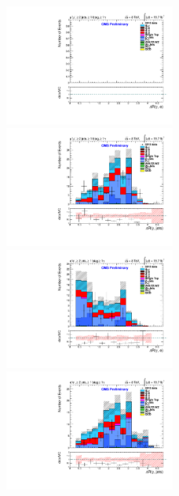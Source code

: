 \begin{figure}
\includegraphics[width=0.5\textwidth]{Plots/ControlPlots/TTbarPhotonAnalysis/MuMu/Photons/SignalPhotons/Photon_deltaR_electrons_splitTTbar_ratio.pdf}
\includegraphics[width=0.5\textwidth]{Plots/ControlPlots/TTbarPhotonAnalysis/MuMu/Photons/SignalPhotons/Photon_deltaR_jets_splitTTbar_ratio.pdf} \\
\includegraphics[width=0.5\textwidth]{Plots/ControlPlots/TTbarPhotonAnalysis/EE/Photons/SignalPhotons/Photon_deltaR_electrons_splitTTbar_ratio.pdf}
\includegraphics[width=0.5\textwidth]{Plots/ControlPlots/TTbarPhotonAnalysis/EE/Photons/SignalPhotons/Photon_deltaR_jets_splitTTbar_ratio.pdf}\\

\end{figure}
